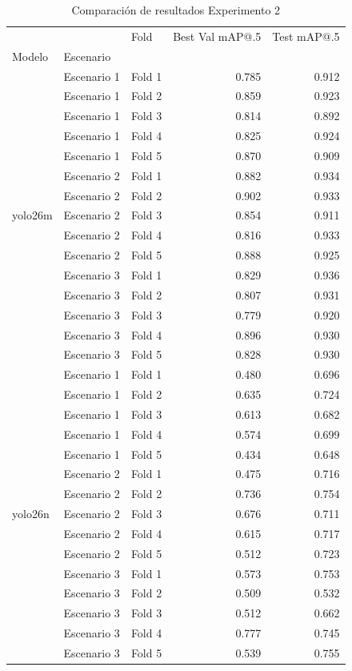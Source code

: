 \begin{table}
\caption{Comparación de resultados Experimento 2}
\label{tab:exp2}
\begin{tabular}{lllrr}
\toprule
 &  & Fold & Best Val mAP@.5 & Test mAP@.5 \\
Modelo & Escenario &  &  &  \\
\midrule
\multirow[c]{15}{*}{yolo26m} & Escenario 1 & Fold 1 & 0.785 & 0.912 \\
 & Escenario 1 & Fold 2 & 0.859 & 0.923 \\
 & Escenario 1 & Fold 3 & 0.814 & 0.892 \\
 & Escenario 1 & Fold 4 & 0.825 & 0.924 \\
 & Escenario 1 & Fold 5 & 0.870 & 0.909 \\
 & Escenario 2 & Fold 1 & 0.882 & 0.934 \\
 & Escenario 2 & Fold 2 & 0.902 & 0.933 \\
 & Escenario 2 & Fold 3 & 0.854 & 0.911 \\
 & Escenario 2 & Fold 4 & 0.816 & 0.933 \\
 & Escenario 2 & Fold 5 & 0.888 & 0.925 \\
 & Escenario 3 & Fold 1 & 0.829 & 0.936 \\
 & Escenario 3 & Fold 2 & 0.807 & 0.931 \\
 & Escenario 3 & Fold 3 & 0.779 & 0.920 \\
 & Escenario 3 & Fold 4 & 0.896 & 0.930 \\
 & Escenario 3 & Fold 5 & 0.828 & 0.930 \\
\multirow[c]{15}{*}{yolo26n} & Escenario 1 & Fold 1 & 0.480 & 0.696 \\
 & Escenario 1 & Fold 2 & 0.635 & 0.724 \\
 & Escenario 1 & Fold 3 & 0.613 & 0.682 \\
 & Escenario 1 & Fold 4 & 0.574 & 0.699 \\
 & Escenario 1 & Fold 5 & 0.434 & 0.648 \\
 & Escenario 2 & Fold 1 & 0.475 & 0.716 \\
 & Escenario 2 & Fold 2 & 0.736 & 0.754 \\
 & Escenario 2 & Fold 3 & 0.676 & 0.711 \\
 & Escenario 2 & Fold 4 & 0.615 & 0.717 \\
 & Escenario 2 & Fold 5 & 0.512 & 0.723 \\
 & Escenario 3 & Fold 1 & 0.573 & 0.753 \\
 & Escenario 3 & Fold 2 & 0.509 & 0.532 \\
 & Escenario 3 & Fold 3 & 0.512 & 0.662 \\
 & Escenario 3 & Fold 4 & 0.777 & 0.745 \\
 & Escenario 3 & Fold 5 & 0.539 & 0.755 \\
\bottomrule
\end{tabular}
\end{table}
